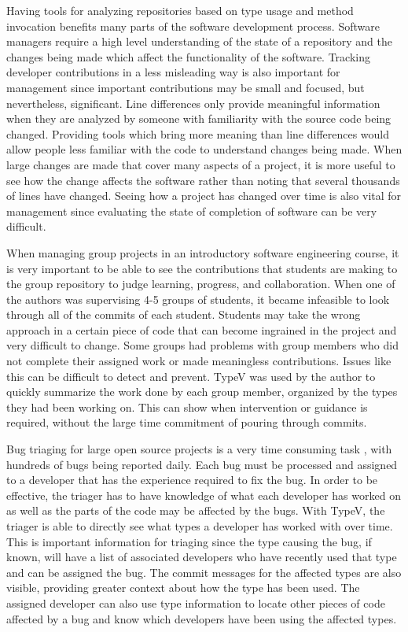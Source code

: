 Having tools for analyzing repositories based on type usage and method invocation benefits many parts of the software development process. Software managers require a high level understanding of the state of a repository and the changes being made which affect the functionality of the software. Tracking developer contributions in a less misleading way is also important for management since important contributions may be small and focused, but nevertheless, significant. Line differences only provide meaningful information when they are analyzed by someone with familiarity with the source code being changed. Providing tools which bring more meaning than line differences would allow people less familiar with the code to understand changes being made. When large changes are made that cover many aspects of a project, it is more useful to see how the change affects the software rather than noting that several thousands of lines have changed. Seeing how a project has changed over time is also vital for management since evaluating the state of completion of software can be very difficult.

When managing group projects in an introductory software engineering course, it is very important to be able to see the contributions that students are making to the group repository to judge learning, progress, and collaboration. When one of the authors was supervising 4-5 groups of students, it became infeasible to look through all of the commits of each student. Students may take the wrong approach in a certain piece of code that can become ingrained in the project and very difficult to change. Some groups had problems with group members who did not complete their assigned work or made meaningless contributions. Issues like this can be difficult to detect and prevent. TypeV was used by the author to quickly summarize the work done by each group member, organized by the types they had been working on. This can show when intervention or guidance is required, without the large time commitment of pouring through commits.


Bug triaging for large open source projects is a very time consuming task \cite{badashian2015}, with hundreds  of bugs being reported daily. Each bug must be processed and assigned to a developer that has the experience required to fix the bug. In order to be effective, the triager has to have knowledge of what each developer has worked on as well as the parts of the code may be affected by the bugs. With TypeV, the triager is able to directly see what types a developer has worked with over time. This is important information for triaging since the type causing the bug, if known, will have a list of associated developers who have recently used that type and can be assigned the bug. The commit messages for the affected types are also visible, providing greater context about how the type has been used. The assigned developer can also use type information to locate other pieces of code affected by a bug and know which developers have been using the affected types.

